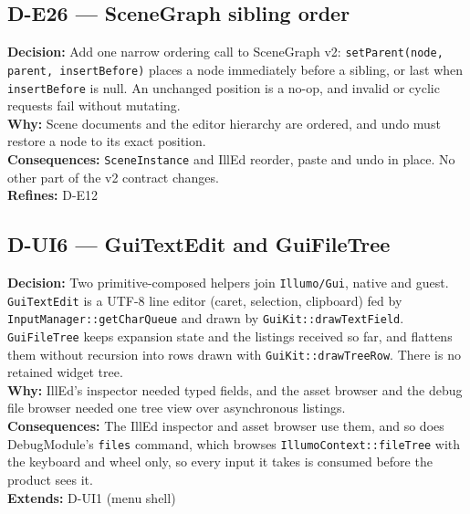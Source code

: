 \subsection*{D-E26 --- SceneGraph sibling order}
\begin{decisionbox}[title={D-E26 \quad 2026-09-23}]
\textbf{Decision:} Add one narrow ordering call to SceneGraph v2:
\texttt{setParent(node, parent, insertBefore)} places a node immediately
before a sibling, or last when \texttt{insertBefore} is null. An unchanged
position is a no-op, and invalid or cyclic requests fail without mutating.\\
\textbf{Why:} Scene documents and the editor hierarchy are ordered, and undo
must restore a node to its exact position.\\
\textbf{Consequences:} \texttt{SceneInstance} and IllEd reorder, paste and undo
in place. No other part of the v2 contract changes.\\
\textbf{Refines:} D-E12
\end{decisionbox}

\subsection*{D-UI6 --- GuiTextEdit and GuiFileTree}
\begin{decisionbox}[title={D-UI6 \quad 2026-09-23}]
\textbf{Decision:} Two primitive-composed helpers join \texttt{Illumo/Gui},
native and guest. \texttt{GuiTextEdit} is a UTF-8 line editor (caret,
selection, clipboard) fed by \texttt{InputManager::getCharQueue} and drawn by
\texttt{GuiKit::drawTextField}. \texttt{GuiFileTree} keeps expansion state
and the listings received so far, and flattens them without recursion into
rows drawn with \texttt{GuiKit::drawTreeRow}. There is no retained widget
tree.\\
\textbf{Why:} IllEd's inspector needed typed fields, and the asset browser and
the debug file browser needed one tree view over asynchronous listings.\\
\textbf{Consequences:} The IllEd inspector and asset browser use them, and so
does DebugModule's \texttt{files} command, which browses
\texttt{IllumoContext::fileTree} with the keyboard and wheel only, so every
input it takes is consumed before the product sees it.\\
\textbf{Extends:} D-UI1 (menu shell)
\end{decisionbox}

